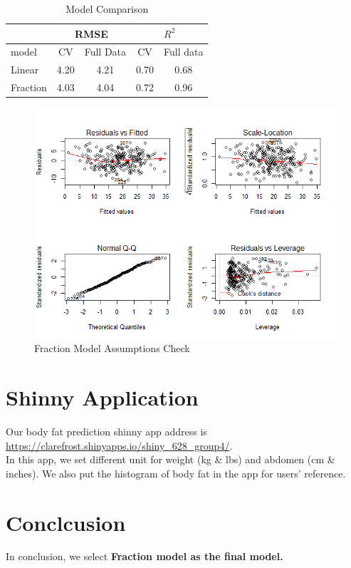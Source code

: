 \documentclass[11pt, twocolumn]{article}
\makeatletter
\def\maxwidth{\ifdim\Gin@nat@width>\linewidth\linewidth
    \else\Gin@nat@width\fi}
\let\Oldincludegraphics\includegraphics
\renewcommand{\includegraphics}[1]{\Oldincludegraphics[width=.8\maxwidth]{#1}}
\makeatother
\begin{document}
\begin{table}[]
\centering
\begin{tabular}{l|cc|cc}
\hline
      & \multicolumn{2}{c}{RMSE} & \multicolumn{2}{c}{$R^2$} \\
\hline
model & CV & Full Data & CV & Full data \\
\hline
 Linear & 4.20 & 4.21 & 0.70 & 0.68\\
 Fraction &  4.03 & 4.04 & 0.72 & 0.96 \\
 \hline
\end{tabular}
\caption{Model Comparison}
\label{model.comp}
\end{table}


\begin{figure}[h!]
  \centering
  \includegraphics{../Figure/Frac.diagonose.png}
  \caption{Fraction Model Assumptions Check}
  \label{fig:FracMdAspCheck}
\end{figure}


\section{Shinny Application}
Our body fat prediction shinny app address is \url{https://clarefrost.shinyapps.io/shiny_628_group4/}.\\

In this app, we set different unit for weight (kg \& lbs) and abdomen (cm \& inches). We also put the histogram of body fat in the app for users' reference.


\section{Conclcusion}
In conclusion, we select \textbf{Fraction model as the final model.} 
\end{document}
